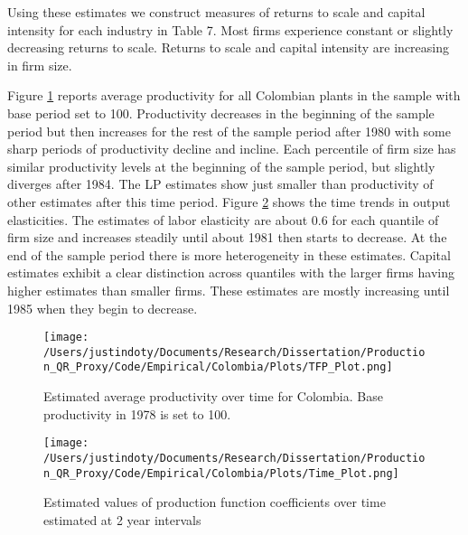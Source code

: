 \documentclass[11pt]{article}
\begin{document}
Using these estimates we construct measures of returns to scale and capital intensity for each industry in Table 7. Most firms experience constant or slightly decreasing returns to scale. Returns to scale and capital intensity are increasing in firm size.


Figure \ref{fig:COLpgrowth} reports average productivity for all Colombian plants in the sample with base period set to 100. Productivity decreases in the beginning of the sample period but then increases for the rest of the sample period after 1980 with some sharp periods of productivity decline and incline. Each percentile of firm size has similar productivity levels at the beginning of the sample period, but slightly diverges after 1984. The LP estimates show just smaller than productivity of other estimates after this time period. Figure \ref{fig:COLtimecoef} shows the time trends in output elasticities. The estimates of labor elasticity are about 0.6 for each quantile of firm size and increases steadily until about 1981 then starts to decrease. At the end of the sample period there is more heterogeneity in these estimates. Capital estimates exhibit a clear distinction across quantiles with the larger firms having higher estimates than smaller firms. These estimates are mostly increasing until 1985 when they begin to decrease.

\begin{figure}[H]
\centering
\texttt{[image: /Users/justindoty/Documents/Research/Dissertation/Production\_QR\_Proxy/Code/Empirical/Colombia/Plots/TFP\_Plot.png]}
\caption{Estimated average productivity over time for Colombia. Base productivity in 1978 is set to 100.}
\label{fig:COLpgrowth}
\end{figure}



\begin{figure}[H]
\centering
\texttt{[image: /Users/justindoty/Documents/Research/Dissertation/Production\_QR\_Proxy/Code/Empirical/Colombia/Plots/Time\_Plot.png]}
\caption{Estimated values of production function coefficients over time estimated at 2 year intervals}
\label{fig:COLtimecoef}
\end{figure}
\end{document}
